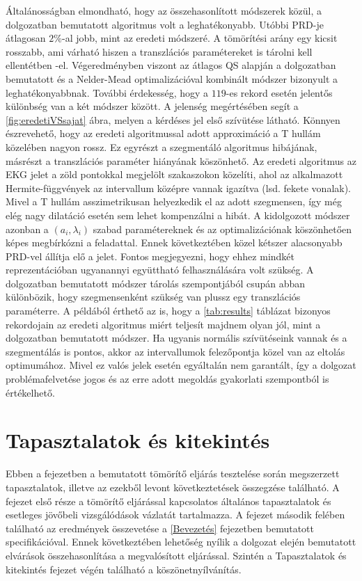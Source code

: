 \documentclass[oneside,titlepage,12pt,a4paper]{report}
\begin{document}
Általánosságban elmondható, hogy az összehasonlított módszerek közül, a dolgozatban bemutatott algoritmus volt a leghatékonyabb. Utóbbi PRD-je átlagosan $2\%$-al jobb, mint az eredeti módszeré. A tömörítési arány egy kicsit rosszabb, ami várható hiszen a transzlációs paramétereket is tárolni kell ellentétben \cite{hexp1}-el. Végeredményben viszont az átlagos QS alapján a dolgozatban bemutatott és a Nelder-Mead optimalizációval kombinált módszer bizonyult a leghatékonyabbnak. További érdekesség, hogy a $119$-es rekord esetén jelentős különbség van a két módszer között. A jelenség megértésében segít a \ref{fig:eredetiVSsajat} ábra, melyen a kérdéses jel első szívütése látható. Könnyen észrevehető, hogy az eredeti algoritmussal adott approximáció a T hullám közelében nagyon rossz. Ez egyrészt a szegmentáló algoritmus hibájának, másrészt a transzlációs paraméter hiányának köszönhető. Az eredeti algoritmus az EKG jelet a zöld pontokkal megjelölt szakaszokon közelíti, ahol az alkalmazott Hermite-függvények az intervallum középre vannak igazítva (lsd. fekete vonalak). Mivel a T hullám asszimetrikusan helyezkedik el az adott szegmensen, így még elég nagy dilatáció esetén sem lehet kompenzálni a hibát. A kidolgozott módszer azonban a $(a_i,\lambda_i)$ szabad paramétereknek és az optimalizációnak köszönhetően képes megbírkózni a feladattal. Ennek következtében közel kétszer alacsonyabb PRD-vel állítja elő a jelet. Fontos megjegyezni, hogy ehhez mindkét reprezentációban ugyanannyi együttható felhasználására volt szükség. A dolgozatban bemutatott módszer tárolás szempontjából csupán abban különbözik, hogy szegmensenként szükség van plussz egy transzlációs paraméterre. A példából érthető az is, hogy a \ref{tab:results} táblázat bizonyos rekordojain az eredeti algoritmus miért teljesít majdnem olyan jól, mint a dolgozatban bemutatott módszer. Ha ugyanis normális szívütéseink vannak és a szegmentálás is pontos, akkor az intervallumok felezőpontja közel van az eltolás optimumához. Mivel ez valós jelek esetén egyáltalán nem garantált, így a dolgozat problémafelvetése jogos és az erre adott megoldás gyakorlati szempontból is értékelhető.

\chapter{Tapasztalatok és kitekintés}

Ebben a fejezetben a bemutatott tömörítő eljárás tesztelése során megszerzett tapasztalatok, illetve az ezekből levont következtetések összegzése található. A fejezet első része a tömörítő eljárással kapcsolatos általános tapasztalatok és esetleges jövőbeli vizsgálódások vázlatát tartalmazza. A fejezet második felében található az eredmények összevetése a \ref{Bevezetés} fejezetben bemutatott specifikációval. Ennek következtében lehetőség nyílik a dolgozat elején bemutatott elvárások összehasonlítása a megvalósított eljárással. Szintén a Tapasztalatok és kitekintés fejezet végén található a köszönetnyílvánítás.  
\end{document}
